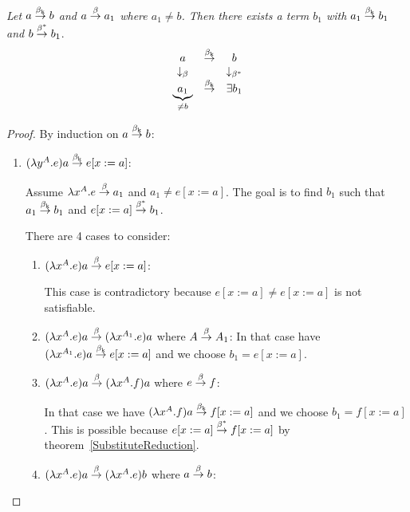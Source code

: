 \begin{theorem}
    \label{KeyReductionDiamond}
    \emph{Let $a \stackrel{\beta_{\text{k}}}{\to} b$ and $a \stackrel{\beta}{\to} a_1$ where $a_1 \ne b$. Then there
    exists a term $b_1$ with $a_1 \stackrel{\beta_{\text{k}}}{\to} b_1$ and $b \stackrel{\beta^*}{\to} b_1$}.
    $$
    \begin{array}{ccc}
        a
        & \stackrel{\beta_{\text{k}}}{\to}
        & b
        \\
        \downarrow_\beta
        &
        & \downarrow_{\beta^*}
        \\
        \underbrace{a_1}_{\ne b}
        & \stackrel{\beta_{\text{k}}}{\to}
        & \exists b_1
    \end{array}
    $$
    \begin{proof}
        By induction on $a \stackrel{\beta_{\text{k}}}{\to} b$:
        \begin{enumerate}
            \item $(\lambda y^A.e) a \stackrel{\beta_{\text{k}}}{\to} e[x:=a]$:

                Assume $\lambda x^A.e
                \stackrel{\beta}{\to} a_1$ and $a_1 \ne e[x:=a]$. The goal is to find $b_1$
                such that $a_1 \stackrel{\beta_{\text{k}}}{\to} b_1$ and $e[x:=a] \stackrel{\beta^*}{\to} b_1$.

                There are 4 cases to consider:
                \begin{enumerate}
                    \item $(\lambda x^A.e)a \stackrel{\beta}{\to} e[x:=a]$:

                        This case is
                        contradictory because $e[x:=a] \ne e[x:=a]$ is not
                        satisfiable.

                    \item $(\lambda x^A.e)a \stackrel{\beta}{\to} (\lambda x^{A_1}.e) a$ where
                        $A \stackrel{\beta}{\to} A_1$: In that case have $(\lambda x^{A_1}.e)
                        a \stackrel{\beta_{\text{k}}}{\to} e[x:=a]$ and we choose $b_1 = e[x:=a]$.

                    \item $(\lambda x^A.e)a \stackrel{\beta}{\to} (\lambda x^A.f) a$ where $e
                        \stackrel{\beta}{\to} f$:

                        In that case we have $(\lambda x^A.f)a
                        \stackrel{\beta_{\text{k}}}{\to} f[x:=a]$ and we choose $b_1 = f[x:=a]$. This
                        is possible because $e[x:=a] \stackrel{\beta^*}{\to} f[x:=a]$ by
                        theorem~\ref{SubstituteReduction}.

                    \item $(\lambda x^A.e)a \stackrel{\beta}{\to} (\lambda x^A.e)b$ where $a
                        \stackrel{\beta}{\to} b$:


\end{enumerate}
\end{enumerate}
\end{proof}
\end{theorem}
